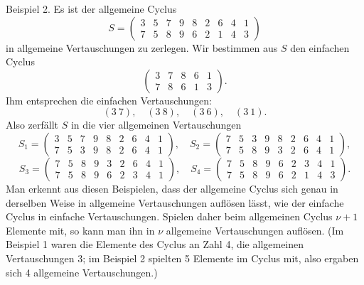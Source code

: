 \documentclass[10pt]{article}
\begin{document}
Beispiel 2. Es ist der allgemeine Cyclus
\[
S=\begin{pmatrix}3&5&7&9&8&2&6&4&1\\7&5&8&9&6&2&1&4&3\end{pmatrix}
\]
in allgemeine Vertauschungen zu zerlegen. Wir bestimmen aus \(S\) den einfachen Cyclus
\[
\begin{pmatrix}3&7&8&6&1\\7&8&6&1&3\end{pmatrix}.
\]
Ihm entsprechen die einfachen Vertauschungen:
\[
(3\ 7),\quad(3\ 8),\quad(3\ 6),\quad(3\ 1).
\]
Also zerfällt \(S\) in die vier allgemeinen Vertauschungen
\[
S_1=\begin{pmatrix}3&5&7&9&8&2&6&4&1\\7&5&3&9&8&2&6&4&1\end{pmatrix},\quad
S_2=\begin{pmatrix}7&5&3&9&8&2&6&4&1\\7&5&8&9&3&2&6&4&1\end{pmatrix},
\]
\[
S_3=\begin{pmatrix}7&5&8&9&3&2&6&4&1\\7&5&8&9&6&2&3&4&1\end{pmatrix},\quad
S_4=\begin{pmatrix}7&5&8&9&6&2&3&4&1\\7&5&8&9&6&2&1&4&3\end{pmatrix}.
\]
Man erkennt aus diesen Beispielen, dass der allgemeine Cyclus sich genau in derselben Weise in allgemeine Vertauschungen auflösen lässt, wie der einfache Cyclus in einfache Vertauschungen. Spielen daher beim allgemeinen Cyclus \(\nu+1\) Elemente mit, so kann man ihn in \(\nu\) allgemeine Vertauschungen auflösen. (Im Beispiel 1 waren die Elemente des Cyclus an Zahl 4, die allgemeinen Vertauschungen 3; im Beispiel 2 spielten 5 Elemente im Cyclus mit, also ergaben sich 4 allgemeine Vertauschungen.)
\end{document}
